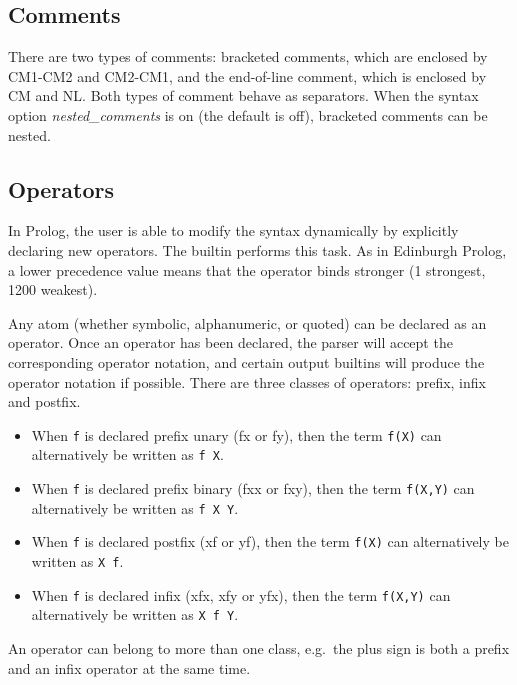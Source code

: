 \subsection{Comments}

There are two types of comments: bracketed comments, which are enclosed
by CM1-CM2 and CM2-CM1, and the end-of-line comment, which is enclosed
by CM and NL. Both types of comment behave as separators.
When the syntax option {\em nested_comments} is on (the default is off),
bracketed comments can be nested.


\subsection{Operators}
In Prolog, the user is able to modify the syntax dynamically by explicitly 
declaring new operators. The builtin  performs this 
task. As in Edinburgh Prolog, a lower precedence value means that the
operator binds stronger (1 strongest, 1200 weakest).

Any atom (whether symbolic, alphanumeric, or quoted) can be declared as an
operator.  Once an operator has been declared, the parser will accept
the corresponding operator notation, and certain output builtins will
produce the operator notation if possible.  There are three classes of
operators: prefix, infix and postfix.
\begin{itemize}
\item When \verb.f. is declared prefix unary (fx or fy),
then the term \verb.f(X). can alternatively be written as \verb.f X..
\item When \verb.f. is declared prefix binary (fxx or fxy),
then the term \verb.f(X,Y). can alternatively be written as \verb.f X Y..
\item When \verb.f. is declared postfix (xf or yf),
then the term \verb.f(X). can alternatively be written as \verb.X f..
\item When \verb.f. is declared infix (xfx, xfy or yfx),
then the term \verb.f(X,Y). can alternatively be written as \verb.X f Y..
\end{itemize}
An operator can belong to more than one class, e.g.\ the plus sign
is both a prefix and an infix operator at the same time.

